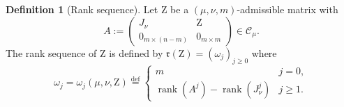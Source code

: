 \documentclass[12pt,a4paper,reqno]{amsart}
\theoremstyle{plain}
\theoremstyle{definition}
\newtheorem{definition}[theorem]{Definition}
\newcommand{\defin}{\overset{\mathrm{def}}{=}}
\newcommand{\1}{\mathds{1}}
\newcommand{\C}{\mathcal{C}}
\newcommand{\Z}{\mathrm{Z}}
\DeclareMathOperator{\rk}{rank}
\begin{document}
\begin{definition}[Rank sequence]\label{rank-seq} Let $\Z$ be a  $(\mu,\nu,m)$-admissible matrix with
\begin{equation}\label{matrixA}
A:=\left(\begin{array}{c|c}
J_{\nu} & \Z\\ \hline
0_{m\times (n-m)} & 0_{m\times m}
\end{array}\right)\in \C_\mu. 
\end{equation}
The rank sequence of $\Z$ is defined by $\mathfrak{r}(\Z)=(\omega_j)_{j\geq 0}$ where
\begin{equation}\label{omega_i}
\omega_j=\omega_j(\mu,\nu,\Z)\defin
\begin{cases}
m & j=0,\\
\rk(A^j)-\rk(J_{\nu}^j) &  j\geq 1. 
\end{cases}
\end{equation}
\end{definition}
\end{document}
